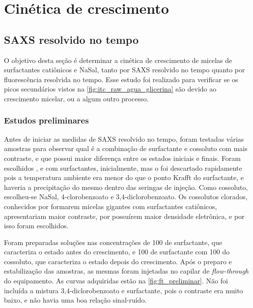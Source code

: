 	
\part{Cinética de crescimento}
	\chapter{SAXS resolvido no tempo}
	O objetivo desta seção é determinar a cinética de crescimento de micelas de surfactantes catiônicos e NaSal, tanto por SAXS resolvido no tempo quanto por fluorescência resolvida no tempo. Esse estudo foi realizado para verificar se os picos secundários vistos na \autoref{fig:itc_raw_agua_glicerina} são devido ao crescimento micelar, ou a algum outro processo.
	
	\section{Estudos preliminares} 
	Antes de iniciar as medidas de SAXS resolvido no tempo, foram testadas várias amostras para observar qual é a combinação de surfactante e cossoluto com mais contraste, e que possui maior diferença entre os estados iniciais e finais. Foram escolhidos \CTAB, \TTAB{} e \DTAB{} com surfactantes, inicialmente, mas o \CTAB{} foi descartado rapidamente pois a temperatura ambiente era menor do que o ponto Krafft do surfactante, e haveria a precipitação do mesmo dentro das seringas de injeção. Como cossoluto, escolheu-se NaSal, 4-clorobenzoato e 3,4-diclorobenzoato. Os cossolutos clorados, conhecidos por formarem micelas gigantes com surfactantes catiônicos,\cite{Gravsholt1976} apresentariam maior contraste, por possuírem maior densidade eletrônica, e por isso foram escolhidos. %
	
	Foram preparadas soluções nas concentrações de 100 \mM{} de surfactante, que caracteriza o estado antes do crescimento, e 100 \mM{} de surfactante com 100 \mM{} do cossoluto, que caracteriza o estado depois do crescimento. Após o preparo e estabilização das amostras, as mesmas foram injetadas no capilar de \emph{flow-through} do equipamento. As curvas adquiridas estão na \autoref{fig:ft_preliminar}. Não foi incluída a mistura 3,4-diclorobenzoato e surfactante, pois o contraste era muito baixo, e não havia uma boa relação sinal-ruído.
	
